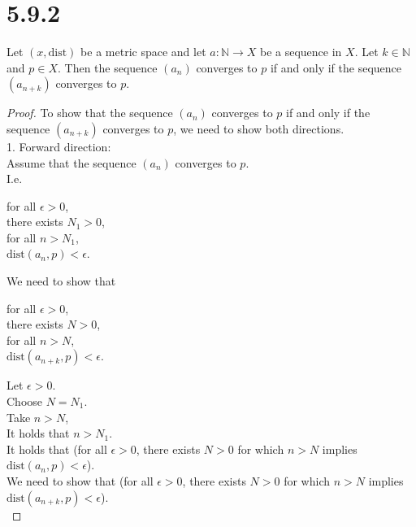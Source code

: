 \documentclass{article}
\newcommand{\dist}{\text{dist}}
\theoremstyle{mytheoremstyle}
\theoremstyle{mytheoremstyle}
\theoremstyle{myproblemstyle}
\begin{document}
    \section{5.9.2}
    \begin{problem}
        Let $(x, \text{dist})$ be a metric space and let $a: \mathbb{N} \to X$ be a sequence in $X$. Let $k \in \mathbb{N}$ and $p \in X$.
        Then the sequence $(a_n)$ converges to $p$ if and only if the sequence $(a_{n+k})$ converges to $p$.
    \end{problem}
    \begin{proof}
        To show that the sequence $(a_n)$ converges to $p$ if and only if the sequence $(a_{n+k})$ converges to $p$,
        we need to show both directions. \\
        1. Forward direction: \\
        Assume that the sequence $(a_n)$ converges to $p$. \\
        I.e. 
        \begin{center}
            for all $\epsilon > 0$, \\
            there exists $N_1 > 0$, \\
            for all $n > N_1$, \\
            $\dist(a_n, p) < \epsilon$.
        \end{center}
        We need to show that 
        \begin{center}
            for all $\epsilon > 0$, \\
            there exists $N > 0$, \\
            for all $n > N$, \\
            $\dist(a_{n+k}, p) < \epsilon$.
        \end{center}
        Let $\epsilon > 0$. \\
        Choose $N = N_1$. \\
        Take $n > N$, \\
        It holds that $n > N_1$. \\



        It holds that (for all $\epsilon > 0$, there exists $N > 0$ for which $n > N$ implies $\text{dist}(a_n, p) < \epsilon$). \\
        We need to show that (for all $\epsilon > 0$, there exists $N > 0$ for which $n > N$ implies $\text{dist}(a_{n+k}, p) < \epsilon$). \\
    \end{proof}
\end{document}
